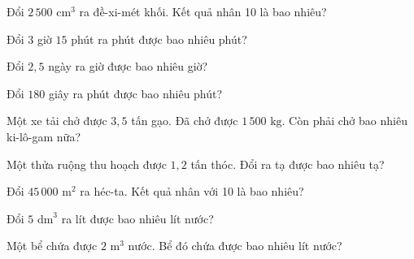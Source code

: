 \begin{ex}
  Đổi $2\,500\text{ cm}^3$ ra đề-xi-mét khối. Kết quả nhân 10 là bao nhiêu?
\end{ex}

\begin{ex}
  Đổi $3$ giờ $15$ phút ra phút được bao nhiêu phút?
\end{ex}

\begin{ex}
  Đổi $2{,}5$ ngày ra giờ được bao nhiêu giờ?
\end{ex}

\begin{ex}
  Đổi $180$ giây ra phút được bao nhiêu phút?
\end{ex}

\begin{ex}
  Một xe tải chở được $3{,}5$ tấn gạo. Đã chở được $1\,500\text{ kg}$. Còn phải chở bao nhiêu ki-lô-gam nữa?
\end{ex}

\begin{ex}
  Một thửa ruộng thu hoạch được $1{,}2$ tấn thóc. Đổi ra tạ được bao nhiêu tạ?
\end{ex}

\begin{ex}
  Đổi $45\,000\text{ m}^2$ ra héc-ta. Kết quả nhân với 10 là bao nhiêu?
\end{ex}

\begin{ex}
  Đổi $5\text{ dm}^3$ ra lít được bao nhiêu lít nước?
\end{ex}

\begin{ex}
  Một bể chứa được $2\text{ m}^3$ nước. Bể đó chứa được bao nhiêu lít nước?
\end{ex}

